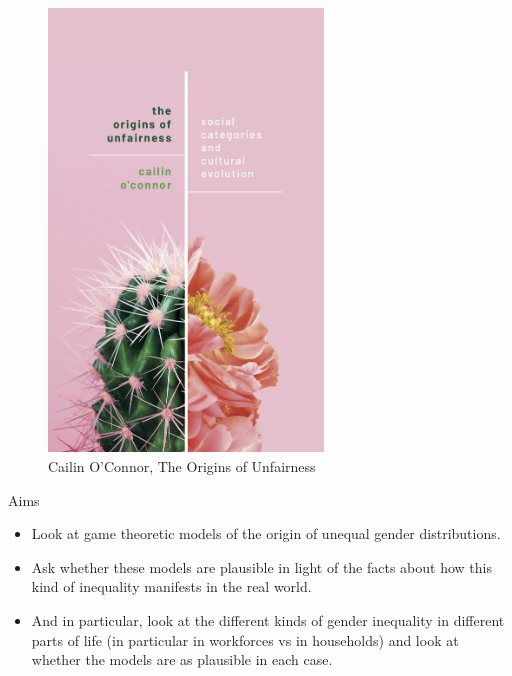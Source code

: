 \documentclass[
  ignorenonframetext,
]{beamer}
\providecommand{\tightlist}{%
  \setlength{\itemsep}{0pt}\setlength{\parskip}{0pt}}
\begin{document}
\begin{frame}
\begin{figure}
\centering
\includegraphics[width=0.65\textwidth,height=0.65\textheight]{images/oconnor_visual.jpg}
\caption{Cailin O'Connor, The Origins of Unfairness}
\end{figure}
\end{frame}

\begin{frame}{Aims}
\protect\hypertarget{aims-1}{}
\begin{itemize}
\tightlist
\item
  Look at game theoretic models of the origin of unequal gender
  distributions.
\item
  Ask whether these models are plausible in light of the facts about how
  this kind of inequality manifests in the real world.
\item
  And in particular, look at the different kinds of gender inequality in
  different parts of life (in particular in workforces vs in households)
  and look at whether the models are as plausible in each case.
\end{itemize}
\end{frame}
\end{document}
